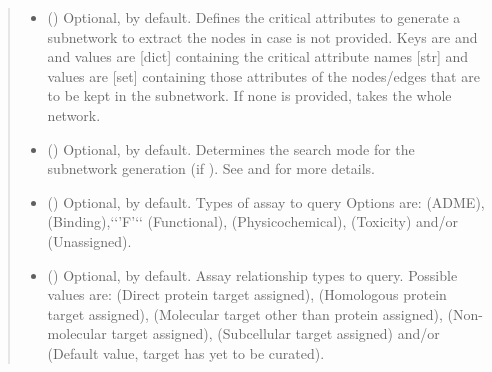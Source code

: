 \documentclass[letterpaper,10pt,english]{sphinxmanual}
\begin{document}
\begin{fulllineitems}
\begin{fulllineitems}
\begin{quote}
\begin{description}
\begin{itemize}
\item {} 
 () \textendash{} Optional,  by default. Defines the critical
attributes to generate a subnetwork to extract the nodes in
case  is not provided. Keys are  and
 and values are {[}dict{]} containing the critical
attribute names {[}str{]} and values are {[}set{]} containing those
attributes of the nodes/edges that are to be kept in the
subnetwork. If none is provided, takes the whole network.

\item {} 
 () \textendash{} Optional,  by default. Determines the search mode
for the subnetwork generation (if ). See
{\hyperref[\detokenize{reference:pypath.main.PyPath.search_attr_or}]{}} and
{\hyperref[\detokenize{reference:pypath.main.PyPath.search_attr_and}]{}} for more
details.

\item {} 
 () \textendash{} Optional, \sphinxcode{\sphinxupquote{{[}'B', 'F'{]}}} by default. Types of assay to query
Options are:  (ADME),  (Binding),{}`{}`’F’{}`{}`
(Functional),  (Physicochemical),  (Toxicity)
and/or  (Unassigned).

\item {} 
 () \textendash{} Optional, \sphinxcode{\sphinxupquote{{[}'D', 'H'{]}}} by default. Assay relationship
types to query. Possible values are:  (Direct protein
target assigned),  (Homologous protein target
assigned),  (Molecular target other than protein
assigned),  (Non-molecular target assigned), 
(Subcellular target assigned) and/or  (Default value,
target has yet to be curated).


\end{itemize}
\end{description}
\end{quote}
\end{fulllineitems}
\end{fulllineitems}
\end{document}
